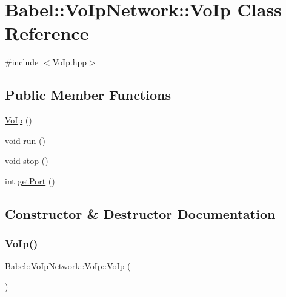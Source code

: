 \hypertarget{classBabel_1_1VoIpNetwork_1_1VoIp}{}\section{Babel\+:\+:Vo\+Ip\+Network\+:\+:Vo\+Ip Class Reference}
\label{classBabel_1_1VoIpNetwork_1_1VoIp}


{\ttfamily \#include $<$Vo\+Ip.\+hpp$>$}

\subsection*{Public Member Functions}
\begin{DoxyCompactItemize}
\item 
\hyperlink{classBabel_1_1VoIpNetwork_1_1VoIp_afec1e709cbb7c34eea5c966fe72263cd}{Vo\+Ip} ()
\item 
void \hyperlink{classBabel_1_1VoIpNetwork_1_1VoIp_a4cb124cfa4efba921d49a9d4016dc2f7}{run} ()
\item 
void \hyperlink{classBabel_1_1VoIpNetwork_1_1VoIp_a3189b0e42439fd8a17ac63d5a2693e13}{stop} ()
\item 
int \hyperlink{classBabel_1_1VoIpNetwork_1_1VoIp_a8584ff9891a393dd01dfa0407cd5e7fb}{get\+Port} ()
\end{DoxyCompactItemize}


\subsection{Constructor \& Destructor Documentation}
\mbox{\label{classBabel_1_1VoIpNetwork_1_1VoIp_afec1e709cbb7c34eea5c966fe72263cd}} 
\subsubsection{\texorpdfstring{Vo\+Ip()}{VoIp()}}
{\footnotesize\ttfamily Babel\+::\+Vo\+Ip\+Network\+::\+Vo\+Ip\+::\+Vo\+Ip (\begin{DoxyParamCaption}{ }\end{DoxyParamCaption})\hspace{0.3cm}{\ttfamily [explicit]}}




